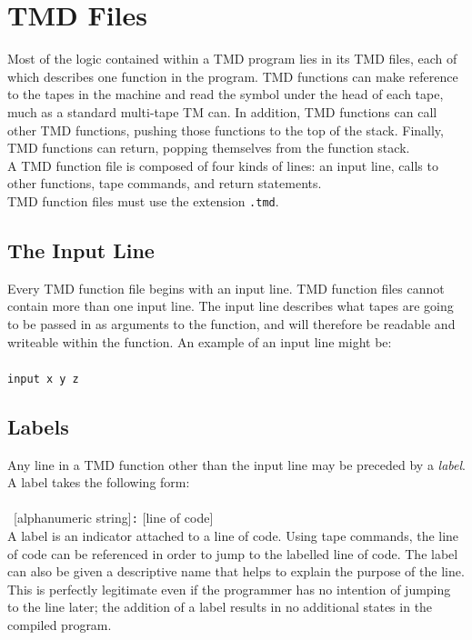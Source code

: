 \documentclass[11pt]{article}
\begin{document}
\section{TMD Files}

Most of the logic contained within a TMD program lies in its TMD files, each of which describes one function in the program. TMD functions can make reference to the tapes in the machine and read the symbol under the head of each tape, much as a standard multi-tape TM can. In addition, TMD functions can call other TMD functions, pushing those functions to the top of the stack. Finally, TMD functions can return, popping themselves from the function stack. \\

A TMD function file is composed of four kinds of lines: an input line, calls to other functions, tape commands, and return statements. \\

TMD function files must use the extension \texttt{.tmd}.

\subsection{The Input Line}

Every TMD function file begins with an input line. TMD function files cannot contain more than one input line. The input line describes what tapes are going to be passed in as arguments to the function, and will therefore be readable and writeable within the function. An example of an input line might be: \\ \\
\texttt{input x y z}

\subsection{Labels}

Any line in a TMD function other than the input line may be preceded by a \emph{label}. A label takes the following form: \\ \\
~[alphanumeric string]\texttt{:} [line of code] \\

A label is an indicator attached to a line of code. Using tape commands, the line of code can be referenced in order to jump to the labelled line of code. The label can also be given a descriptive name that helps to explain the purpose of the line. This is perfectly legitimate even if the programmer has no intention of jumping to the line later; the addition of a label results in no additional states in the compiled program.
\end{document}
